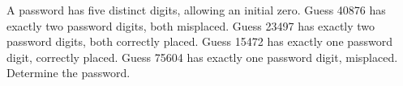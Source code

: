 A password has five distinct digits, allowing an initial zero. Guess 40876 has exactly two password digits, both misplaced. Guess 23497 has exactly two password digits, both correctly placed. Guess 15472 has exactly one password digit, correctly placed. Guess 75604 has exactly one password digit, misplaced. Determine the password.
